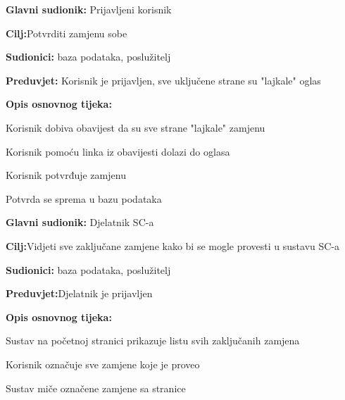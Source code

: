 \noindent {}
\begin{packed_item}
	
	\item \textbf{Glavni sudionik: }Prijavljeni korisnik
	\item  \textbf{Cilj:}Potvrditi zamjenu sobe
	\item  \textbf{Sudionici:} baza podataka, poslužitelj
	\item  \textbf{Preduvjet:} Korisnik je prijavljen, sve uključene strane su "lajkale" oglas
	\item  \textbf{Opis osnovnog tijeka:}
	
	\item[] \begin{packed_enum}
		
		\item Korisnik dobiva obavijest da su sve strane "lajkale" zamjenu
		\item Korisnik pomoću linka iz obavijesti dolazi do oglasa
		\item Korisnik potvrđuje zamjenu
		\item Potvrda se sprema u bazu podataka
		
	\end{packed_enum}
\end{packed_item}
\noindent {}
\begin{packed_item}
	
	\item \textbf{Glavni sudionik: }Djelatnik SC-a
	\item  \textbf{Cilj:}Vidjeti sve zaključane zamjene kako bi se mogle provesti u sustavu SC-a
	\item  \textbf{Sudionici:} baza podataka, poslužitelj
	\item  \textbf{Preduvjet:}Djelatnik je prijavljen
	\item  \textbf{Opis osnovnog tijeka:}
	
	\item[] \begin{packed_enum}
		
		\item Sustav na početnoj stranici prikazuje listu svih zaključanih zamjena
		\item Korisnik označuje sve zamjene koje je proveo
		\item Sustav miče označene zamjene sa stranice
		
		
	\end{packed_enum}
	
\end{packed_item}	
